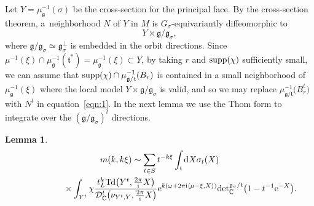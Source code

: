 \documentclass[11pt]{article}
\numberwithin{equation}{section}
\newtheorem{Lemma}[Theorem]{Lemma}
\newcommand{\pair}[2]{\langle #1, #2 \rangle}
\newcommand{\tn}[1]{\textnormal{#1}}
\renewcommand{\i}{{\mathrm{i}}}
\def\g{\ensuremath{\mathfrak{g}}}
\def\t{\ensuremath{\mathfrak{t}}}
\def\bC{\ensuremath{\mathbb{C}}}
\def\supp{\ensuremath{\textnormal{supp}}}
\def\Td{\ensuremath{\textnormal{Td}}}
\def\calDC{\ensuremath{\mathcal{D}_{\bC}}}
\def\supp{\ensuremath{\textnormal{supp}}}
\def\de{\ensuremath{\tn{det}_\bC}}
\begin{document}
Let $Y=\mu_{\g}^{-1}(\sigma)$ be the cross-section for the principal face. By the cross-section theorem, a~neighborhood $N$ of $Y$ in $M$ is $G_\sigma$-equivariantly diffeomorphic to
\[ Y\times \g/\g_\sigma, \]
where $\g/\g_\sigma \simeq \g_\sigma^\perp$ is embedded in the orbit directions. Since $\mu^{-1}(\xi)\cap \mu_\g^{-1}(\t^\ast)=\mu_\g^{-1}(\xi)\subset Y$, by taking $r$ and $\supp(\chi)$ sufficiently small, we can assume that $\supp(\chi)\cap \mu_{\g/\t}^{-1}(B_r)$ is contained in a small neighborhood of $\mu_\g^{-1}(\xi)$ where the local model $Y\times \g/\g_\sigma$ is valid, and so we may replace $\mu_{\g/\t}^{-1}\big(B_r^t\big)$ with $N^t$ in equation~\eqref{eqn:1}. In the next lemma we use the Thom form to integrate over the $(\g/\g_\sigma)^t$ directions.
\begin{Lemma}
\begin{gather}
m(k,k\xi)\sim \sum_{t \in S}t^{-k\xi} \int_\t {\rm d}X \sigma_t(X)\nonumber\\
\hphantom{m(k,k\xi)\sim}{}\times \int_{Y^t} \chi \frac{t_L^k\Td\big(Y^t,\tfrac{2\pi}{\i}X\big)}{\calDC^t\big(\nu_{Y^t,Y},\tfrac{2\pi}{\i}X\big)}{\rm e}^{k(\omega+2\pi \i\pair{\mu-\xi}{X})}\de^{\g_\sigma/\t}\big(1-t^{-1}{\rm e}^{-X}\big).\label{eqn:2}
\end{gather}
\end{Lemma}
\end{document}
